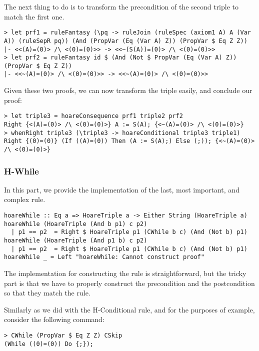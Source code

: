 \documentclass{article}
\begin{document}
The next thing to do is to transform the precondition of the second triple to match the first one.

\begin{lstlisting}
> let prf1 = ruleFantasy (\pq -> ruleJoin (ruleSpec (axiom1 A) A (Var A)) (ruleSepR pq)) (And (PropVar (Eq (Var A) Z)) (PropVar $ Eq Z Z))
|- <<(A)=(0)> /\ <(0)=(0)>> -> <<~(S(A))=(0)> /\ <(0)=(0)>>
> let prf2 = ruleFantasy id $ (And (Not $ PropVar (Eq (Var A) Z)) (PropVar $ Eq Z Z))
|- <<~(A)=(0)> /\ <(0)=(0)>> -> <<~(A)=(0)> /\ <(0)=(0)>>
\end{lstlisting}

Given these two proofs, we can now transform the triple easily, and conclude our proof:

\begin{lstlisting}
> let triple3 = hoareConsequence prf1 triple2 prf2
Right {<(A)=(0)> /\ <(0)=(0)>} A := S(A); {<~(A)=(0)> /\ <(0)=(0)>}
> whenRight triple3 (\triple3 -> hoareConditional triple3 triple1)
Right {(0)=(0)} (If ((A)=(0)) Then (A := S(A);) Else (;)); {<~(A)=(0)> /\ <(0)=(0)>}
\end{lstlisting}

\subsubsection{H-While}

In this part, we provide the implementation of the last, most important, and complex rule.

\begin{lstlisting}
hoareWhile :: Eq a => HoareTriple a -> Either String (HoareTriple a)
hoareWhile (HoareTriple (And b p1) c p2)
  | p1 == p2  = Right $ HoareTriple p1 (CWhile b c) (And (Not b) p1)
hoareWhile (HoareTriple (And p1 b) c p2)
  | p1 == p2  = Right $ HoareTriple p1 (CWhile b c) (And (Not b) p1)
hoareWhile _ = Left "hoareWhile: Cannot construct proof"
\end{lstlisting}

The implementation for constructing the rule is straightforward, but the tricky part is that we have to properly construct the precondition and the postcondition so that they match the rule.

Similarly as we did with the H-Conditional rule, and for the purposes of example, consider the following command:

\begin{lstlisting}
> CWhile (PropVar $ Eq Z Z) CSkip
(While ((0)=(0)) Do {;});
\end{lstlisting}
\end{document}
